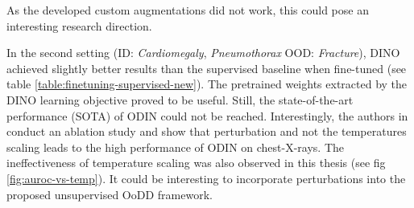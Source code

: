 As the developed custom augmentations did not work, this could pose an interesting research direction.
\par 
In the second setting (ID: \textit{Cardiomegaly}, \textit{Pneumothorax} OOD: \textit{Fracture}), DINO achieved slightly better results than the supervised baseline when fine-tuned (see table \ref{table:finetuning-supervised-new}).
The pretrained weights extracted by the DINO learning objective proved to be useful.
Still, the state-of-the-art performance (SOTA) of ODIN could not be reached.
Interestingly, the authors in \citep{Berger2021} conduct an ablation study and show that perturbation and not the temperatures scaling leads to the high performance of ODIN on chest-X-rays.
The ineffectiveness of temperature scaling was also observed in this thesis (see fig \ref{fig:auroc-vs-temp}).
It could be interesting to incorporate perturbations into the proposed unsupervised OoDD framework.


